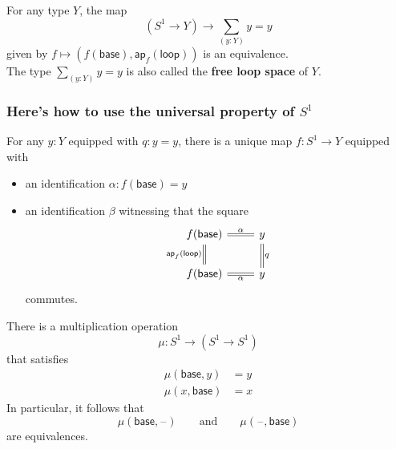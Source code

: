 \documentclass[handout]{beamer}
\newcommand{\sphere}[1]{S^{#1}}
\newcommand{\ap}{\mathsf{ap}}
\newcommand{\blank}{\mathord{\hspace{1pt}\text{--}\hspace{1pt}}}
\newcommand{\baseS}{\mathsf{base}}
\newcommand{\loopS}{\mathsf{loop}}
\newcommand{\apply}[2]{#1(#2)}
\begin{document}
\begin{frame}
  \begin{theorem}
    For any type $Y$, the map
    \begin{equation*}
      (\sphere{1}\to Y)\to \sum_{(y:Y)}y=y
    \end{equation*}
    given by $f\mapsto (\apply{f}{\baseS},\apply{\ap_f}{\loopS})$ is an equivalence.\\[1em]

    The type $\sum_{(y:Y)}y=y$ is also called the \textbf{free loop space} of $Y$.
  \end{theorem}
\end{frame}

\begin{frame}
  \frametitle{Here's how to use the universal property of $\sphere{1}$}
  For any $y:Y$ equipped with $q:y=y$, there is a unique map $f:\sphere{1}\to Y$ equipped with
  \begin{itemize}
  \item an identification $\alpha:\apply{f}{\baseS}=y$
  \item an identification $\beta$ witnessing that the square
    \begin{equation*}
      \begin{tikzcd}[ampersand replacement=\&]
        \apply{f}{\baseS} \arrow[d,equals,swap,"\apply{\ap_f}{\loopS}"] \arrow[r,equals,"\alpha"] \& y \arrow[d,equals,"q"] \\
        \apply{f}{\baseS} \arrow[r,swap,equals,"\alpha"] \& y
      \end{tikzcd}
    \end{equation*}
    commutes.
  \end{itemize}
\end{frame}

\begin{frame}
  \begin{theorem}
    There is a multiplication operation
    \begin{equation*}
      \mu : \sphere{1}\to(\sphere{1}\to\sphere{1})
    \end{equation*}
    that satisfies
    \begin{align*}
      \apply{\mu}{\baseS,y} & = y \\
      \apply{\mu}{x,\baseS} & = x
    \end{align*}
    In particular, it follows that
    \begin{equation*}
      \apply{\mu}{\baseS,\blank} \qquad\text{and}\qquad\apply{\mu}{\blank,\baseS}
    \end{equation*}
    are equivalences.
  \end{theorem}
\end{frame}
\end{document}
